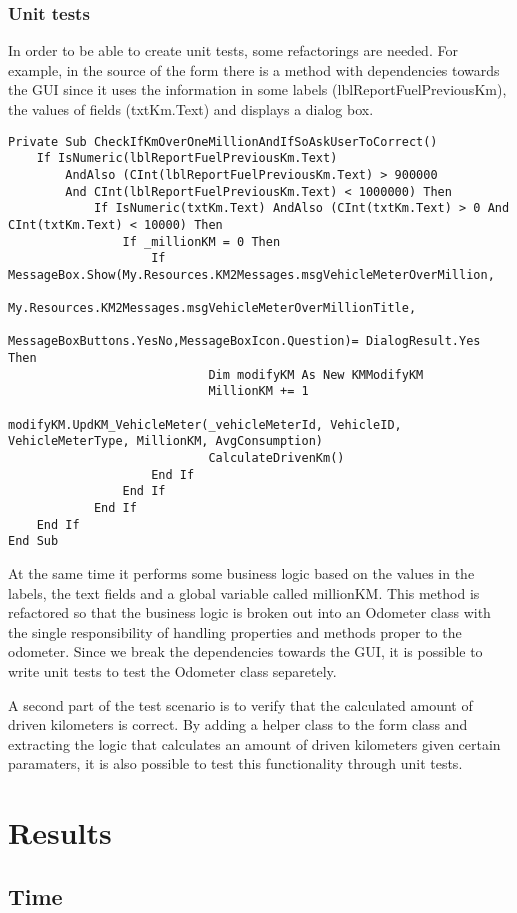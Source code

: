 \documentclass{article}
\begin{document}
			\subsubsection{Unit tests}

			In order to be able to create unit tests, some refactorings are needed. For example, in the source of the form there is a method with dependencies towards the GUI since it uses the information in some labels (lblReportFuelPreviousKm), the values of fields (txtKm.Text) and displays a dialog box.
			\begin{lstlisting}
Private Sub CheckIfKmOverOneMillionAndIfSoAskUserToCorrect()
	If IsNumeric(lblReportFuelPreviousKm.Text) 
		AndAlso (CInt(lblReportFuelPreviousKm.Text) > 900000 	
		And CInt(lblReportFuelPreviousKm.Text) < 1000000) Then
			If IsNumeric(txtKm.Text) AndAlso (CInt(txtKm.Text) > 0 And CInt(txtKm.Text) < 10000) Then
				If _millionKM = 0 Then
					If MessageBox.Show(My.Resources.KM2Messages.msgVehicleMeterOverMillion,
						My.Resources.KM2Messages.msgVehicleMeterOverMillionTitle,
						MessageBoxButtons.YesNo,MessageBoxIcon.Question)= DialogResult.Yes Then
							Dim modifyKM As New KMModifyKM 
							MillionKM += 1
							modifyKM.UpdKM_VehicleMeter(_vehicleMeterId, VehicleID, VehicleMeterType, MillionKM, AvgConsumption)
							CalculateDrivenKm()
					End If
				End If
			End If
	End If
End Sub
		\end{lstlisting}

			At the same time it performs some business logic based on the values in the labels, the text fields and a global variable called millionKM.
			This method is refactored so that the business logic is broken out into an Odometer class with the single responsibility of handling properties and methods proper to the odometer. Since we break the dependencies towards the GUI, it is possible to write unit tests to test the Odometer class separetely.

			A second part of the test scenario is to verify that the calculated amount of driven kilometers is correct. By adding a helper class to the form class and extracting the logic that calculates an amount of driven kilometers given certain paramaters, it is also possible to test this functionality through unit tests.

	\section{Results}
		\subsection{Time}
		
\end{document}
